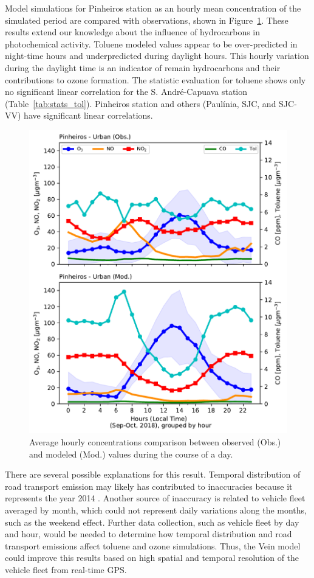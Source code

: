 Model simulations for Pinheiros station as an hourly mean concentration of the simulated period are compared with observations, shown in Figure~\ref{fig:Var_pinh_day}.
These results extend our knowledge about the influence of hydrocarbons in photochemical activity.
Toluene modeled values appear to be over-predicted in night-time hours and underpredicted during daylight hours.
This hourly variation during the daylight time is an indicator of remain hydrocarbons and their contributions to ozone formation.
The statistic evaluation for toluene shows only no significant linear correlation for the S. André-Capuava station (Table~\ref{tab:stats_tol}).
Pinheiros station and others (Paulínia, SJC, and SJC-VV) have significant linear correlations.

\begin{figure}[ht]
  \centering
  \includegraphics[width=.7\textwidth]{fig/pol_hour_tol.pdf}
  \caption{Average hourly concentrations comparison between observed (Obs.) and modeled (Mod.) values during the course of a day.}
  \label{fig:Var_pinh_day}
\end{figure}

There are several possible explanations for this result.
Temporal distribution of road transport emission may likely has contributed to inaccuracies because it represents the year 2014 \citep{Andrade2015}.
Another source of inaccuracy is related to vehicle fleet averaged by month, which could not represent daily variations along the months, such as the weekend effect.
Further data collection, such as vehicle fleet by day and hour, would be needed to determine how temporal distribution and road transport emissions affect toluene and ozone simulations.
Thus, the Vein model \citep{Ibarra2018} could improve this results based on high spatial and temporal resolution of the vehicle fleet from real-time GPS.

